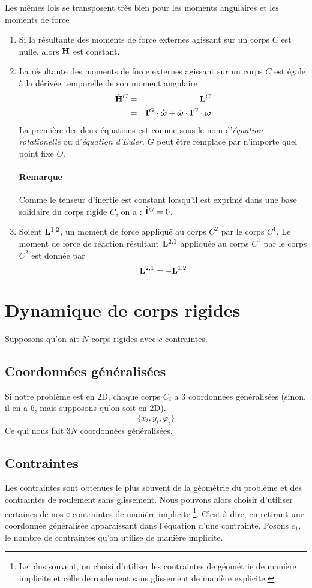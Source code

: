 Les mêmes lois se transposent très bien pour les moments angulaires et les moments de force
\begin{enumerate}
  \item Si la résultante des moments de force externes agissant sur un corps $C$ est nulle, alors ${\bf H}$ est constant.
  \item La résultante des moments de force externes agissant sur un corps $C$ est égale à la dérivée temporelle de son moment angulaire
    \begin{eqnarray*}
      \dot{{\bf H}}^G &=& {\bf L}^G\\
             &=& {\bf I}^G\cdot\mathring{\bm \omega} + \tilde{\bm \omega}\cdot{\bf I}^G\cdot{\bm \omega}
    \end{eqnarray*}
    La première des deux équations est connue sous le nom d'{\em équation rotationelle} ou d'{\em équation d'Euler}. $G$ peut être remplacé par n'importe quel point fixe $O$.
		
		\paragraph{Remarque}
		Comme le tenseur d'inertie est constant lorsqu'il est exprimé dans une base solidaire
		du corps rigide $C$, on a : $\mathring{{\bf I}}^G = 0$.
  \item Soient ${\bf L}^{1,2}$, un moment de force appliqué au corps $C^2$ par le corps $C^1$.
    Le moment de force de réaction résultant ${\bf L}^{2,1}$ appliquée au corps $C^1$ par le corps $C^2$ est donnée par
    \[ {\bf L}^{2,1} = -{\bf L}^{1,2} \]
\end{enumerate}

\section{Dynamique de corps rigides}

Supposons qu'on ait $N$ corps rigides avec $c$ contraintes.

\subsection{Coordonnées généralisées}
Si notre problème est en 2D, chaque corps $C_i$ a 3 coordonnées généralisées (sinon, il en a 6, mais supposons qu'on soit en 2D).
\[ \{x_i, y_i, \varphi_i \} \]
Ce qui nous fait $3N$ coordonnées généralisées.

\subsection{Contraintes}
Les contraintes sont obtenues le plus souvent de la géométrie du problème et des contraintes de roulement sans glissement.
Nous pouvons alors choisir d'utiliser certaines de nos $c$ contraintes de manière implicite
\footnote{Le plus souvent, on choisi d'utiliser les contraintes de géométrie de manière implicite et celle de roulement sans glissement de manière explicite.}.
C'est à dire, en retirant une coordonnée généralisée apparaissant dans l'équation d'une contrainte.
Posons $c_1$, le nombre de contraintes qu'on utilise de manière implicite.

